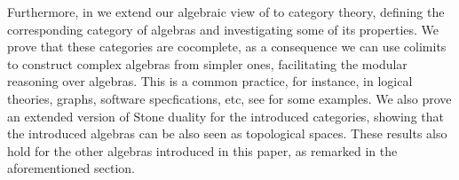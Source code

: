 \ifcategories
Furthermore,  in  we extend our algebraic view of \DAL to category theory, defining the corresponding category of \DAL algebras and investigating some of its properties.  We prove that these categories are cocomplete,  as a consequence we can use colimits to construct complex algebras from simpler ones,  facilitating the modular reasoning over \DAL algebras.  This is a common practice, for instance, in  logical theories, graphs,  software specfications, etc, see \cite{Goguen92} for some examples.  We also prove an extended version of Stone duality for the introduced categories, showing that the introduced algebras can be also seen as  topological spaces. These results also hold for the other algebras introduced in this paper, as remarked in the aforementioned section.
\fi



